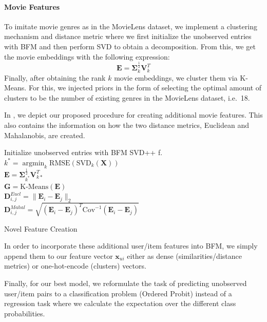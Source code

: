 \documentclass[10pt,conference,compsocconf]{IEEEtran}
\DeclareMathOperator*{\argmin}{argmin}   %
\begin{document}
    \paragraph{Movie Features}
    To imitate movie genres as in the MovieLens dataset, we implement a clustering mechanism and distance metric where we first initialize the unobserved entries with BFM and then perform SVD to obtain a decomposition.
    From this, we get the movie embeddings with the following expression:
    $$\mathbf{E}=\mathbf{\Sigma}_k ^{\frac{1}{2}} \mathbf{V}_k ^T$$
    Finally, after obtaining the rank $k$ movie embeddings, we cluster them via K-Means.
    For this, we injected priors in the form of selecting the optimal amount of clusters to be the number of existing genres in the MovieLens dataset, i.e.~18.

    In , we depict our proposed procedure for creating additional movie features.
    This also contains the information on how the two distance metrics, Euclidean and Mahalanobis, are created.

    \begin{algorithm}
        Initialize unobserved entries with BFM SVD++ f.\\
        $k^*=\argmin_{k} \text{RMSE}(\text{SVD}_{k}(\mathbf{X}))$\\
        $\mathbf{E} = \mathbf{\Sigma}^{\frac{1}{2}}_{k^*}\mathbf{V}_{k*}^T$ \\
        $\mathbf{G} = \text{K-Means}(\mathbf{E})$ \\
         {
             {
                $\mathbf{D}_{i,j} ^{Eucl} = \|\mathbf{E}_i - \mathbf{E}_j\|_2$ \\
                $\mathbf{D}_{i,j} ^{Mahal} = \sqrt{(\mathbf{E}_i-\mathbf{E}_j)^T\text{Cov}^{-1}(\mathbf{E}_i-\mathbf{E}_j)}$
            }
        }
        \caption{Novel Feature Creation}
        \label{alg:algo1}
    \end{algorithm}

    In order to incorporate these additional user/item features into BFM, we simply append them to our feature vector $\mathbf{x}_{ui}$ either as dense (similarities/distance metrics) or one-hot-encode (clusters) vectors.

    Finally, for our best model, we reformulate the task of predicting unobserved user/item pairs to a classification problem (Ordered Probit) instead of a regression task where we calculate the expectation over the different class probabilities.
\end{document}
